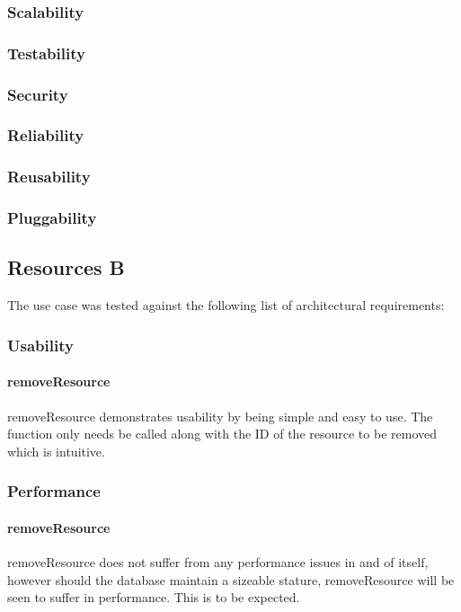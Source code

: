 \documentclass[a4paper]{article}
\begin{document}
\subsubsection {Scalability}
\subsubsection {Testability}
\subsubsection {Security}
\subsubsection {Reliability}
\subsubsection {Reusability}
\subsubsection {Pluggability}


\subsection {Resources B}
The use case was tested against the following list of architectural requirements:
\subsubsection {Usability}

\paragraph{removeResource}
removeResource demonstrates usability by being simple and easy to use. The function only needs be called along with the ID of the resource to be removed which is intuitive.

\subsubsection {Performance}

\paragraph{removeResource}
removeResource does not suffer from any performance issues in and of itself, however should the database maintain a sizeable stature, removeResource will be seen to suffer in performance. This is to be expected.
\end{document}
